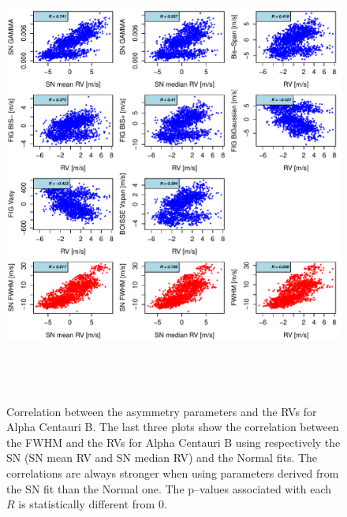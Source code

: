 \documentclass{aa}
\begin{document}
\begin{figure}[htbp]
\begin{center}
\includegraphics[height = 6in]{HD12862_[4]Comparison_para.pdf}  
   \caption{Correlation between the asymmetry parameters and the RVs for Alpha Centauri B. The last three plots show the correlation between the FWHM and the RVs for Alpha Centauri B using respectively the SN (SN mean RV and SN median RV) and the Normal fits. The correlations are always stronger when using parameters derived from the SN fit than the Normal one. The p--values associated with each $R$ is statistically different from $0$.} 
   \label{fig:alphacent:corrPlot}
\end{center}
\end{figure}
%
\end{document}
